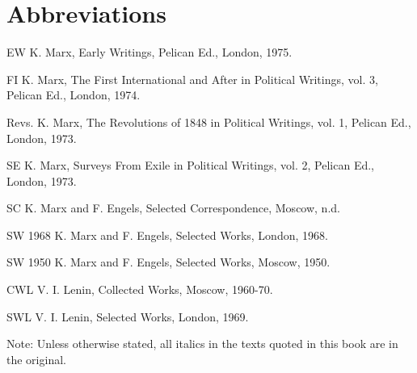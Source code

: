 \chapter*{Abbreviations}



EW K. Marx, Early Writings, Pelican Ed., London, 1975.

FI K. Marx, The First International and After in Political Writings, vol. 3, Pelican Ed., London, 1974.

Revs. K. Marx, The Revolutions of 1848 in Political Writings, vol. 1, Pelican Ed., London, 1973.

SE K. Marx, Surveys From Exile in Political Writings, vol. 2, Pelican Ed., London, 1973.

SC K. Marx and F. Engels, Selected Correspondence, Moscow, n.d.

SW 1968 K. Marx and F. Engels, Selected Works, London, 1968.

SW 1950 K. Marx and F. Engels, Selected Works, Moscow, 1950.

CWL V. I. Lenin, Collected Works, Moscow, 1960-70.

SWL V. I. Lenin, Selected Works, London, 1969.

Note: Unless otherwise stated, all italics in the texts quoted in this book are in the original.